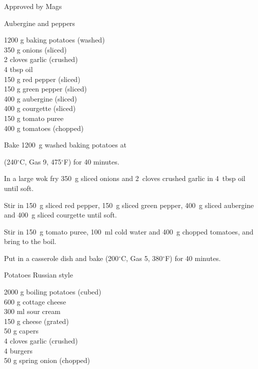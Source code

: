 \begin{menu}{Approved by Mags}
    \begin{recipe}{2}{Aubergine and peppers}%
    
		\begin{ingredients}
		1200 g baking potatoes (washed) \\
	350 g onions (sliced) \\
	2 cloves garlic (crushed) \\
	4 tbsp oil  \\
	150 g red pepper (sliced) \\
	150 g green pepper (sliced) \\
	400 g aubergine (sliced) \\
	400 g courgette (sliced) \\
	150 g tomato puree  \\
	400 g tomatoes (chopped) \\
	
		\end{ingredients}
	
    \begin{instructions}
    \item 
      Bake 1200~g washed baking potatoes
      at
      
      (240$^{\circ}$C, Gas 9, 475$^{\circ}$F)
     for 40 minutes.
    \item 
        In a large wok fry
        350~g sliced onions
        and
        2~cloves crushed garlic
        in
        4~tbsp  oil
        until soft.
      \item 
        Stir in
        150~g sliced red pepper,
        150~g sliced green pepper,
        400~g sliced aubergine
        and
        400~g sliced courgette
        until soft.
      \item 
        Stir in
        150~g  tomato puree,
        100~ml  cold water
        and
        400~g chopped tomatoes,
        and bring to the boil.
      \item 
        Put in a casserole dish and bake 
      (200$^{\circ}$C, Gas 5, 380$^{\circ}$F)
     for 40 minutes.
      
    \end{instructions}
    \end{recipe}%
  
    \begin{recipe}{2}{Potatoes Russian style}%
    
		\begin{ingredients}
		2000 g boiling potatoes (cubed) \\
	600 g cottage cheese  \\
	300 ml sour cream  \\
	150 g cheese (grated) \\
	50 g capers  \\
	4 cloves garlic (crushed) \\
	4  burgers  \\
	50 g spring onion (chopped) \\
	

\end{ingredients}
\end{recipe}
\end{menu}
